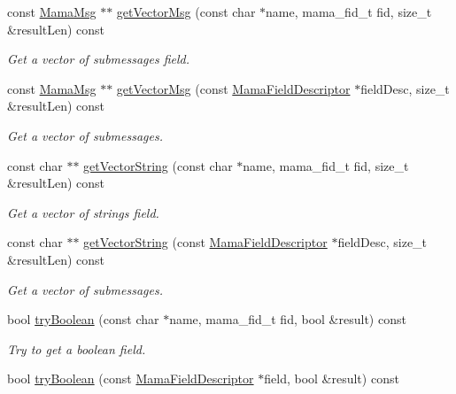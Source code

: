 \begin{DoxyCompactItemize}
const \hyperlink{classWombat_1_1MamaMsg}{MamaMsg} $\ast$$\ast$ \hyperlink{classWombat_1_1MamaMsg_a9dad9e7ddec799ffd3e60c228e5a0ef1}{getVectorMsg} (const char $\ast$name, mama\_\-fid\_\-t fid, size\_\-t \&resultLen) const 
\begin{DoxyCompactList}\small\item\em Get a vector of submessages field. \item\end{DoxyCompactList}\item 
const \hyperlink{classWombat_1_1MamaMsg}{MamaMsg} $\ast$$\ast$ \hyperlink{classWombat_1_1MamaMsg_abb7ec901a227a9168efbf4fcb75f0c25}{getVectorMsg} (const \hyperlink{classWombat_1_1MamaFieldDescriptor}{MamaFieldDescriptor} $\ast$fieldDesc, size\_\-t \&resultLen) const 
\begin{DoxyCompactList}\small\item\em Get a vector of submessages. \item\end{DoxyCompactList}\item 
const char $\ast$$\ast$ \hyperlink{classWombat_1_1MamaMsg_a8e0c42d1bd8b6d5eec91c16b0fb206a4}{getVectorString} (const char $\ast$name, mama\_\-fid\_\-t fid, size\_\-t \&resultLen) const 
\begin{DoxyCompactList}\small\item\em Get a vector of strings field. \item\end{DoxyCompactList}\item 
const char $\ast$$\ast$ \hyperlink{classWombat_1_1MamaMsg_ab56b9c561f6d24cf814a11d7910fc5d5}{getVectorString} (const \hyperlink{classWombat_1_1MamaFieldDescriptor}{MamaFieldDescriptor} $\ast$fieldDesc, size\_\-t \&resultLen) const 
\begin{DoxyCompactList}\small\item\em Get a vector of submessages. \item\end{DoxyCompactList}\item 
bool \hyperlink{classWombat_1_1MamaMsg_ac353caec908ec326e74dc1b5dcc4d5c4}{tryBoolean} (const char $\ast$name, mama\_\-fid\_\-t fid, bool \&result) const 
\begin{DoxyCompactList}\small\item\em Try to get a boolean field. \item\end{DoxyCompactList}\item 
bool \hyperlink{classWombat_1_1MamaMsg_a99334c69175231c1d3016e3f2911476f}{tryBoolean} (const \hyperlink{classWombat_1_1MamaFieldDescriptor}{MamaFieldDescriptor} $\ast$field, bool \&result) const 

\end{DoxyCompactItemize}
